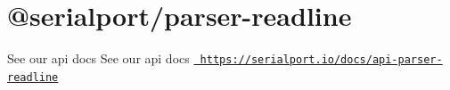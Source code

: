 \chapter{@serialport/parser-\/readline}
\hypertarget{md_Dashboard_2node__modules_2_0dserialport_2parser-readline_2README}{}\label{md_Dashboard_2node__modules_2_0dserialport_2parser-readline_2README}
\label{md_Dashboard_2node__modules_2_0dserialport_2parser-readline_2README_autotoc_md88}%
%
 See our api docs See our api docs \href{https://serialport.io/docs/api-parser-readline}{\texttt{ https\+://serialport.\+io/docs/api-\/parser-\/readline}} 